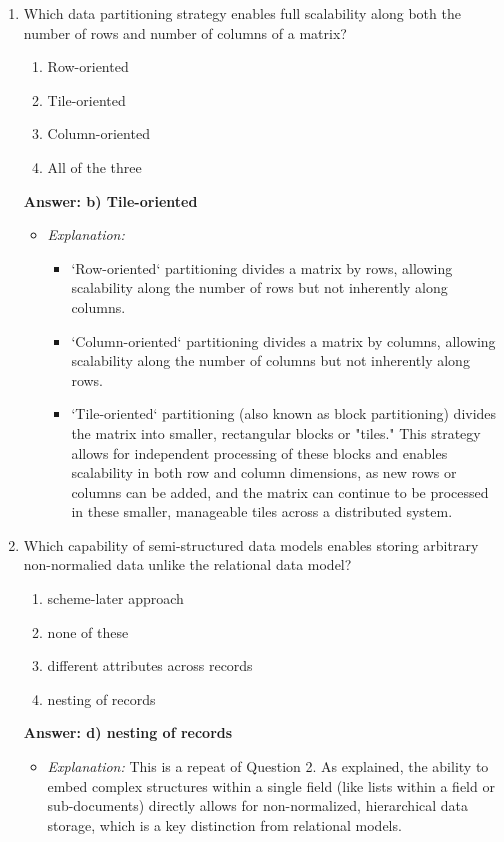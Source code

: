 \documentclass{article}
\begin{document}
\begin{enumerate}[label=\textbf{Question \arabic*.}]
    \item Which data partitioning strategy enables full scalability along both the number of rows and number of columns of a matrix?
        \begin{enumerate}[label=\alph*)]
            \item Row-oriented
            \item Tile-oriented
            \item Column-oriented
            \item All of the three
        \end{enumerate}
        \textbf{Answer: b) Tile-oriented}
        \begin{itemize}
            \item \textit{Explanation:}
            \begin{itemize}
                \item `Row-oriented` partitioning divides a matrix by rows, allowing scalability along the number of rows but not inherently along columns.
                \item `Column-oriented` partitioning divides a matrix by columns, allowing scalability along the number of columns but not inherently along rows.
                \item `Tile-oriented` partitioning (also known as block partitioning) divides the matrix into smaller, rectangular blocks or "tiles." This strategy allows for independent processing of these blocks and enables scalability in both row and column dimensions, as new rows or columns can be added, and the matrix can continue to be processed in these smaller, manageable tiles across a distributed system.
            \end{itemize}
        \end{itemize}
    
    \item Which capability of semi-structured data models enables storing arbitrary non-normalied data unlike the relational data model?
        \begin{enumerate}[label=\alph*)]
            \item scheme-later approach
            \item none of these
            \item different attributes across records
            \item nesting of records
        \end{enumerate}
        \textbf{Answer: d) nesting of records}
        \begin{itemize}
            \item \textit{Explanation:} This is a repeat of Question 2. As explained, the ability to embed complex structures within a single field (like lists within a field or sub-documents) directly allows for non-normalized, hierarchical data storage, which is a key distinction from relational models.
        \end{itemize}
    

\end{enumerate}
\end{document}
